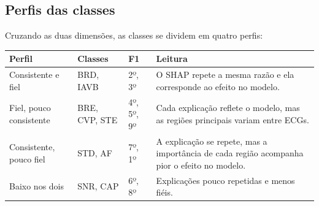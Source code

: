 \documentclass[11pt,a4paper]{article}
\begin{document}
\subsection{Perfis das classes}
Cruzando as duas dimensões, as classes se dividem em quatro perfis:
\begin{table}[H]
\centering
\small
\begin{tabularx}{\textwidth}{lllX}
\toprule
\textbf{Perfil} & \textbf{Classes} & \textbf{F1} & \textbf{Leitura} \\
\midrule
Consistente e fiel & BRD, IAVB & 2º, 3º & O SHAP repete a mesma razão e ela corresponde ao efeito no modelo. \\
\addlinespace
Fiel, pouco consistente & BRE, CVP, STE & 4º, 5º, 9º & Cada explicação reflete o modelo, mas as regiões principais variam entre ECGs. \\
\addlinespace
Consistente, pouco fiel & STD, AF & 7º, 1º & A explicação se repete, mas a importância de cada região acompanha pior o efeito no modelo. \\
\addlinespace
Baixo nos dois & SNR, CAP & 6º, 8º & Explicações pouco repetidas e menos fiéis. \\
\bottomrule
\end{tabularx}
\end{table}
\end{document}
